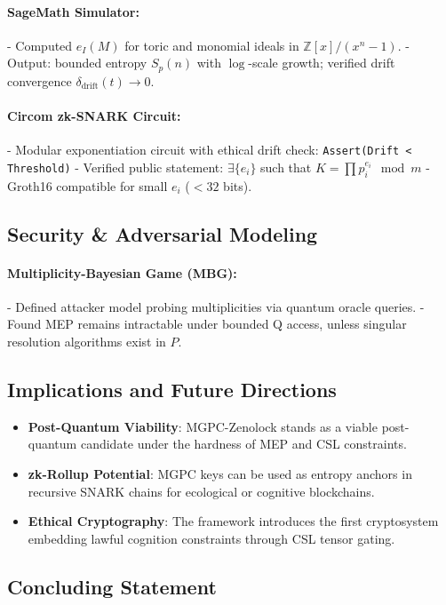 \documentclass[12]{amsart}
\theoremstyle{plain}
\begin{document}
\paragraph{SageMath Simulator:}
- Computed $e_I(M)$ for toric and monomial ideals in $\mathbb{Z}[x]/(x^n - 1)$.
- Output: bounded entropy $S_p(n)$ with $\log$-scale growth; verified drift convergence $\delta_{\text{drift}}(t) \to 0$.

\paragraph{Circom zk-SNARK Circuit:}
- Modular exponentiation circuit with ethical drift check:
  \texttt{Assert(Drift < Threshold)}
- Verified public statement: $\exists \{e_i\}$ such that $K = \prod p_i^{e_i} \mod m$
- Groth16 compatible for small $e_i$ ($< 32$ bits).

\subsection{Security & Adversarial Modeling}

\paragraph{Multiplicity-Bayesian Game (MBG):}
- Defined attacker model probing multiplicities via quantum oracle queries.
- Found MEP remains intractable under bounded Q access, unless singular resolution algorithms exist in $P$.

\subsection{Implications and Future Directions}

\begin{itemize}
    \item \textbf{Post-Quantum Viability}: MGPC-Zenolock stands as a viable post-quantum candidate under the hardness of MEP and CSL constraints.
    \item \textbf{zk-Rollup Potential}: MGPC keys can be used as entropy anchors in recursive SNARK chains for ecological or cognitive blockchains.
    \item \textbf{Ethical Cryptography}: The framework introduces the first cryptosystem embedding lawful cognition constraints through CSL tensor gating.
\end{itemize}

\subsection{Concluding Statement}
\end{document}
